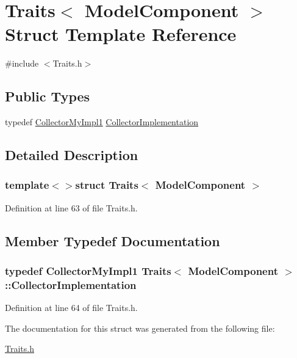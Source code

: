 \hypertarget{struct_traits_3_01_model_component_01_4}{\section{Traits$<$ Model\-Component $>$ Struct Template Reference}
\label{struct_traits_3_01_model_component_01_4}
}


{\ttfamily \#include $<$Traits.\-h$>$}

\subsection*{Public Types}
\begin{DoxyCompactItemize}
\item 
typedef \hyperlink{class_collector_my_impl1}{Collector\-My\-Impl1} \hyperlink{struct_traits_3_01_model_component_01_4_aea662c7138c7186aa5d60a6912d0010a}{Collector\-Implementation}
\end{DoxyCompactItemize}


\subsection{Detailed Description}
\subsubsection*{template$<$$>$struct Traits$<$ Model\-Component $>$}



Definition at line 63 of file Traits.\-h.



\subsection{Member Typedef Documentation}
\hypertarget{struct_traits_3_01_model_component_01_4_aea662c7138c7186aa5d60a6912d0010a}{
\subsubsection[{Collector\-Implementation}]{\setlength{\rightskip}{0pt plus 5cm}typedef {\bf Collector\-My\-Impl1} {\bf Traits}$<$ {\bf Model\-Component} $>$\-::{\bf Collector\-Implementation}}}\label{struct_traits_3_01_model_component_01_4_aea662c7138c7186aa5d60a6912d0010a}


Definition at line 64 of file Traits.\-h.



The documentation for this struct was generated from the following file\-:\begin{DoxyCompactItemize}
\item 
\hyperlink{_traits_8h}{Traits.\-h}\end{DoxyCompactItemize}
